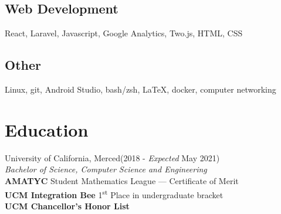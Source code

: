 \documentclass[letterpaper,12pt]{article}
\begin{document}
    \subsection{Web Development}
    React, Laravel, Javascript, Google Analytics, Two.js, HTML, CSS
    \vspace*{-4mm}
    \subsection{Other}
    Linux, git, Android Studio, bash/zsh, \LaTeX, docker, computer networking
    \vspace*{-4mm}
\section{Education}
University of California, Merced\null\hfill(2018 - \emph{Expected} May 2021)\\
           \emph{Bachelor of Science, Computer Science and Engineering}
    \\\textbf{AMATYC} Student Mathematics League --- Certificate of Merit\\
    \textbf{UCM Integration Bee} 1\textsuperscript{st} Place in undergraduate bracket\\
    \textbf{UCM Chancellor's Honor List}
    \vspace*{-2mm}
%
\end{document}
